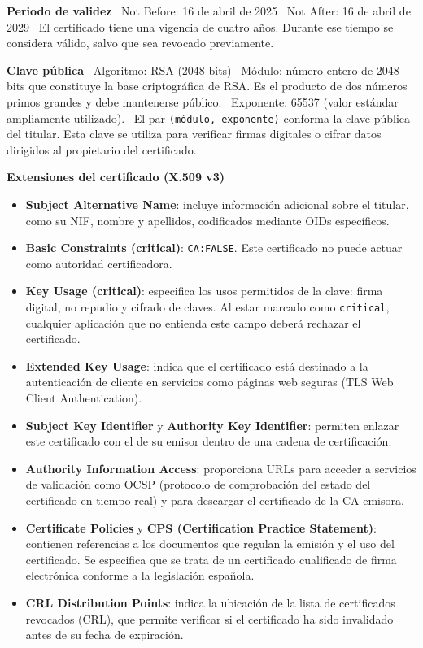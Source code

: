 \textbf{Periodo de validez} \ Not Before: 16 de abril de 2025 \ Not After: 16 de abril de 2029 \ El certificado tiene una vigencia de cuatro años. Durante ese tiempo se considera válido, salvo que sea revocado previamente.

\textbf{Clave pública} \ Algoritmo: RSA (2048 bits) \ Módulo: número entero de 2048 bits que constituye la base criptográfica de RSA. Es el producto de dos números primos grandes y debe mantenerse público. \ Exponente: 65537 (valor estándar ampliamente utilizado). \ El par \texttt{(módulo, exponente)} conforma la clave pública del titular. Esta clave se utiliza para verificar firmas digitales o cifrar datos dirigidos al propietario del certificado.

\textbf{Extensiones del certificado (X.509 v3)}

\begin{itemize}

    \item \textbf{Subject Alternative Name}: incluye información adicional sobre el titular, como su NIF, nombre y apellidos, codificados mediante OIDs específicos.

    \item \textbf{Basic Constraints (critical)}: \texttt{CA:FALSE}. Este certificado no puede actuar como autoridad certificadora.

    \item \textbf{Key Usage (critical)}: especifica los usos permitidos de la clave: firma digital, no repudio y cifrado de claves. Al estar marcado como \texttt{critical}, cualquier aplicación que no entienda este campo deberá rechazar el certificado.

    \item \textbf{Extended Key Usage}: indica que el certificado está destinado a la autenticación de cliente en servicios como páginas web seguras (TLS Web Client Authentication).

    \item \textbf{Subject Key Identifier} y \textbf{Authority Key Identifier}: permiten enlazar este certificado con el de su emisor dentro de una cadena de certificación.

    \item \textbf{Authority Information Access}: proporciona URLs para acceder a servicios de validación como OCSP (protocolo de comprobación del estado del certificado en tiempo real) y para descargar el certificado de la CA emisora.

    \item \textbf{Certificate Policies} y \textbf{CPS (Certification Practice Statement)}: contienen referencias a los documentos que regulan la emisión y el uso del certificado. Se especifica que se trata de un certificado cualificado de firma electrónica conforme a la legislación española.

    \item \textbf{CRL Distribution Points}: indica la ubicación de la lista de certificados revocados (CRL), que permite verificar si el certificado ha sido invalidado antes de su fecha de expiración.

\end{itemize}

